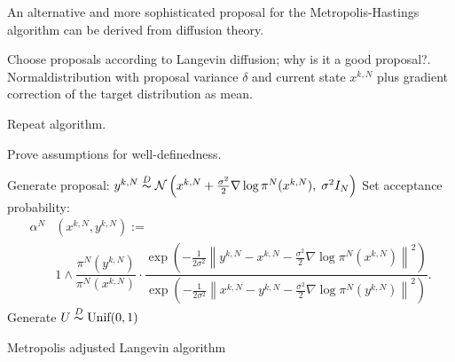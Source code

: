 An alternative and more sophisticated proposal for the Metropolis-Hastings algorithm can be derived from diffusion theory.

Choose proposals according to Langevin diffusion; why is it a good proposal?. Normaldistribution with proposal variance  $ \delta $ and current state $ x^{k,N} $ plus gradient correction of the target distribution as mean.

Repeat algorithm.

Prove assumptions for well-definedness.

\IncMargin{1em}
\begin{algorithm}
\DontPrintSemicolon


\BlankLine

{
  Generate proposal: $ y^{k,N} \stackrel{D}{\thicksim} \mathcal{N}\left(x^{k,N} + \frac{\sigma^2}{2} \nabla \log \pi^{N}(x^{k,N}), \; \sigma^2 I_N\right) $\;
  Set acceptance probability:
  \begin{align*}
   \alpha^{N} & ( x^{k,N}, y^{k,N} )  := \\ 
   & 1 \wedge  \dfrac{\pi^{N}(y^{k,N}) }{\pi^{N}(x^{k,N})} \cdot
    \dfrac{ \exp{\left( - \frac{1}{2\sigma^2} \left\| y^{k,N} - x^{k,N} - \frac{\sigma^2}{2} \nabla \log \pi^{N}(x^{k,N}) \right\|^2 \right)} }{ \exp{\left( - \frac{1}{2\sigma^2} \left\| x^{k,N} - y^{k,N} - \frac{\sigma^2}{2} \nabla \log \pi^{N}(y^{k,N}) \right\|^2 \right)} }.    
  \end{align*}\label{MALAAlgo-AcceptanceProba}
  Generate $ U \stackrel{D}{\thicksim} \text{Unif}(0,1) $\;

}
\caption{Metropolis adjusted Langevin algorithm}\label{Algo-MALA}
\end{algorithm}\DecMargin{1em}
